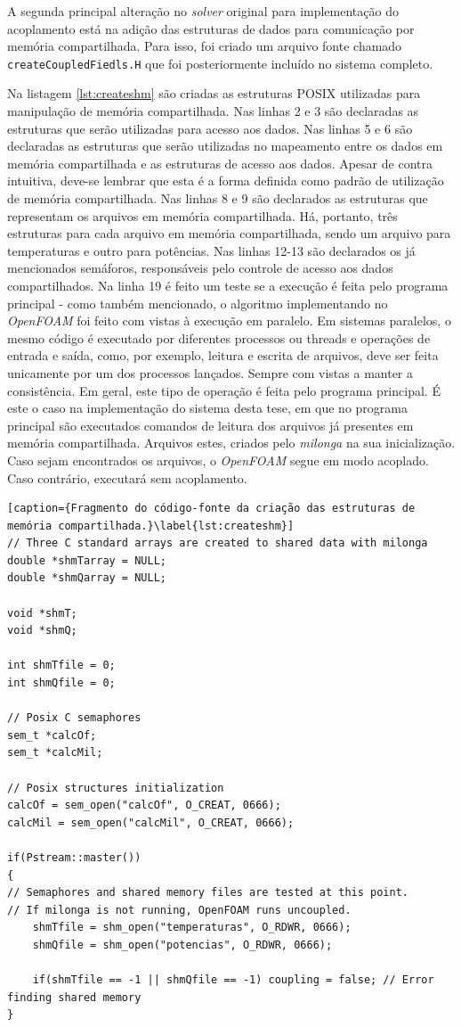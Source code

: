 A segunda principal alteração no \textit{solver} original para implementação do acoplamento
está na adição das estruturas de dados para comunicação por memória compartilhada. Para isso,
foi criado um arquivo fonte chamado \texttt{createCoupledFiedls.H} que foi posteriormente
incluído no sistema completo.

Na listagem \ref{lst:createshm} são criadas as estruturas POSIX utilizadas para manipulação
de memória compartilhada. Nas linhas 2 e 3 são declaradas as estruturas que serão utilizadas para
acesso aos dados. Nas linhas 5 e 6 são declaradas as estruturas que serão utilizadas no mapeamento
entre os dados em memória compartilhada e as estruturas de acesso aos dados. Apesar de contra intuitiva,
deve-se lembrar que esta é a forma definida como padrão de utilização de memória compartilhada. Nas linhas
8 e 9 são declarados as estruturas que representam os arquivos em memória compartilhada. Há, portanto, três
estruturas para cada arquivo em memória compartilhada, sendo um arquivo para temperaturas e outro para potências.
Nas linhas 12-13 são declarados os já mencionados semáforos, responsáveis pelo controle de acesso aos
dados compartilhados. Na linha 19 é feito um teste se a execução é feita pelo programa principal - como também
mencionado, o algoritmo implementando no \textit{OpenFOAM} foi feito com vistas à execução em paralelo.
Em sistemas paralelos, o mesmo código é executado por diferentes processos ou threads e operações
de entrada e saída, como, por exemplo, leitura e escrita de arquivos, deve ser feita unicamente por um
dos processos lançados. Sempre com vistas a manter a consistência. Em geral, este tipo de operação
é feita pelo programa principal. É este o caso na implementação do sistema desta tese, em que no programa principal são executados
comandos de leitura dos arquivos já presentes em memória
compartilhada. Arquivos estes, criados pelo \textit{milonga} na sua inicialização. Caso sejam encontrados
os arquivos, o \textit{OpenFOAM} segue em modo acoplado. Caso contrário, executará sem acoplamento.


\begin{lstlisting}[caption={Fragmento do código-fonte da criação das estruturas de memória compartilhada.}\label{lst:createshm}]
// Three C standard arrays are created to shared data with milonga
double *shmTarray = NULL;
double *shmQarray = NULL;

void *shmT;
void *shmQ;

int shmTfile = 0;
int shmQfile = 0;

// Posix C semaphores
sem_t *calcOf;
sem_t *calcMil;

// Posix structures initialization
calcOf = sem_open("calcOf", O_CREAT, 0666);
calcMil = sem_open("calcMil", O_CREAT, 0666);

if(Pstream::master())
{
// Semaphores and shared memory files are tested at this point.
// If milonga is not running, OpenFOAM runs uncoupled.
    shmTfile = shm_open("temperaturas", O_RDWR, 0666);
    shmQfile = shm_open("potencias", O_RDWR, 0666);
    
    if(shmTfile == -1 || shmQfile == -1) coupling = false; // Error finding shared memory
}
\end{lstlisting}

